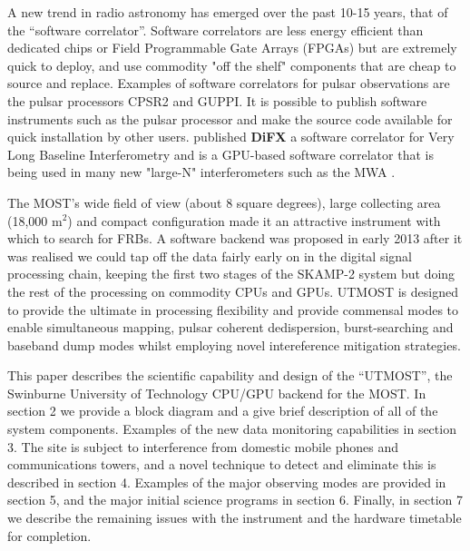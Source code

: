 A new trend in radio astronomy has emerged over the past 10-15 years, that of the ``software correlator''. Software correlators are less energy efficient than dedicated chips or Field Programmable Gate Arrays (FPGAs) but are extremely quick to deploy, and use commodity "off the shelf" components that are cheap to source and replace. Examples of software correlators for pulsar observations are the pulsar processors CPSR2 \citep{Bailes_2009} and GUPPI\citep{DuPlain_2008}. It is possible to publish software instruments such as the pulsar processor  \citep{van_Straten_2011} and make the source code available for quick installation by other users. \citep{Deller_2007} published {\bf DiFX} a software correlator for Very Long Baseline Interferometry and  \citep{Clark_2012} is a GPU-based software correlator that is being used in many new "large-N" interferometers such as the MWA \citep{Tingay_2013}. 

The MOST's wide field of view (about 8 square degrees), large collecting area (18,000 m$^2$) and compact configuration made it an attractive instrument with which to search for FRBs. A software backend was proposed in early 2013 after it was realised we could tap off the data fairly early on in the digital signal processing chain, keeping the first two stages of the SKAMP-2 system but doing the rest of the processing on commodity CPUs and GPUs. UTMOST is designed to provide the ultimate in processing flexibility and provide commensal modes to enable simultaneous mapping, pulsar coherent dedispersion, burst-searching and baseband dump modes whilst employing novel intereference mitigation strategies.

This paper describes the scientific capability and design of the ``UTMOST'', the Swinburne University of Technology CPU/GPU backend for the MOST. In section 2 we provide a block diagram and a give brief description of all of the system components. Examples of the new data monitoring capabilities in section 3. The site is subject to interference from domestic mobile phones and communications towers, and a novel technique to detect and eliminate this is described in section 4. Examples of the major observing modes are provided in section 5, and the major initial science programs in section 6. Finally, in section 7 we describe the remaining issues with the instrument and the hardware timetable for completion.



